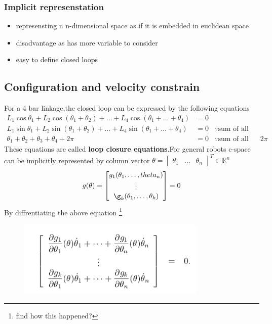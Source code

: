 \documentclass[a4paper]{article}
\begin{document}
\subsubsection{Implicit represenstation}
\begin{itemize}
	\item represensting n n-dimensional space as if it is embedded in euclidean space
	\item disadvantage as has more variable to consider
	\item easy to define closed loops
\end{itemize}
\subsection{Configuration and velocity constrain}
For a 4 bar linkage,the closed loop can be expressed by the following equations
\begin{align*}
	L_1\cos\theta_1+L_2\cos(\theta_1 + \theta_2) + \ldots +L_4\cos(\theta_1+\ldots+\theta_4) & = 0                                                      \\
	L_1\sin\theta_1+L_2\sin(\theta_1 + \theta_2) + \ldots +L_4\sin(\theta_1+\ldots+\theta_4) & = 0 & \because \text{sum of all vectors in loop is zero} \\
	\theta_1 + \theta_2 + \theta_3 + \theta_4 + 2 \pi                                        & = 0 & \because \text{sum of all angles is $2\pi$}
\end{align*}
These equations are called \textbf{loop closure equations}.For general robots c-space can be implicitly represented by column vector $\theta = \begin{bmatrix} \theta_1 & \ldots & \theta_n\end{bmatrix}^T \in \mathds{R}^n$
\begin{equation}
	g(\theta) = \begin{bmatrix}
		g_1(\theta_1,\ldots,theta_n) \\
		\vdots                       \\
		\g_k(\theta_1,\ldots,\theta_k)
	\end{bmatrix} = 0
\end{equation}
By diffrentiating the above equation \footnote{find how this happened?}
            \begin{figure}[H]
                                    \centering
                                    \includegraphics[width=0.8\textwidth]{equationofclosedloop.png}
                                    \caption{}
                                    \label{fig:}
                                \end{figure}
\end{document}

